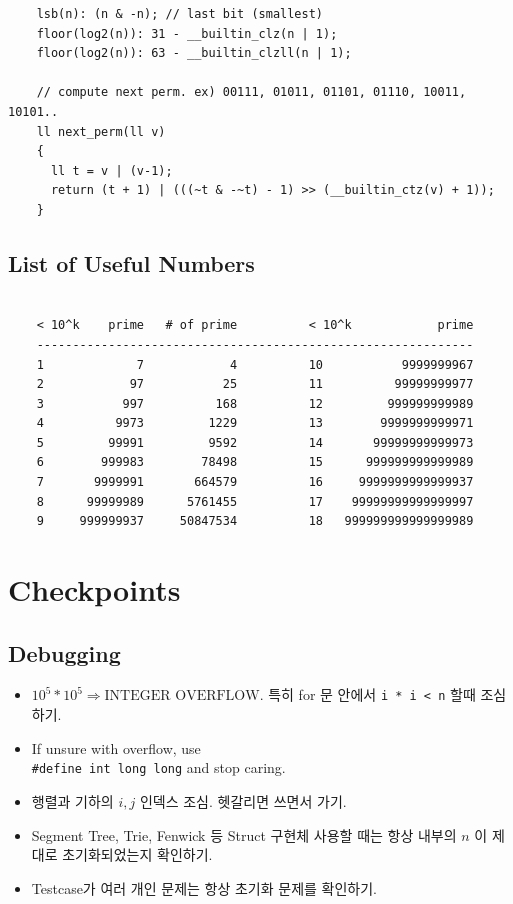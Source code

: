 \documentclass[landscape,8pt]{article}
\begin{document}
\begin{multicols}{2}
\begin{verbatim}
    lsb(n): (n & -n); // last bit (smallest)
    floor(log2(n)): 31 - __builtin_clz(n | 1);
    floor(log2(n)): 63 - __builtin_clzll(n | 1);

    // compute next perm. ex) 00111, 01011, 01101, 01110, 10011, 10101..
    ll next_perm(ll v)
    {
      ll t = v | (v-1);
      return (t + 1) | (((~t & -~t) - 1) >> (__builtin_ctz(v) + 1));
    }
  \end{verbatim}
  \subsection{List of Useful Numbers}
  \begin{verbatim}

    < 10^k    prime   # of prime          < 10^k            prime
    -------------------------------------------------------------
    1             7            4          10           9999999967
    2            97           25          11          99999999977
    3           997          168          12         999999999989
    4          9973         1229          13        9999999999971
    5         99991         9592          14       99999999999973
    6        999983        78498          15      999999999999989
    7       9999991       664579          16     9999999999999937
    8      99999989      5761455          17    99999999999999997
    9     999999937     50847534          18   999999999999999989
  \end{verbatim}
\columnbreak


\section{Checkpoints}
  \subsection{Debugging}
\begin{itemize}
  \item $10^5 * 10^5 \Rightarrow \text{INTEGER OVERFLOW}$. 특히 for 문 안에서 \texttt{i * i < n} 할때 조심하기.
  \item If unsure with overflow, use \\
  \texttt{\#define int long long} and stop caring.
  \item 행렬과 기하의 $i, j$ 인덱스 조심. 헷갈리면 쓰면서 가기.
  \item Segment Tree, Trie, Fenwick 등 Struct 구현체 사용할 때는 항상 내부의 $n$ 이 제대로 초기화되었는지 확인하기.
  \item Testcase가 여러 개인 문제는 항상 초기화 문제를 확인하기.
\end{itemize}

\end{multicols}
\end{document}
